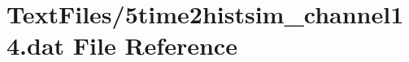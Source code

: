 \hypertarget{5time2histsim__channel14_8dat}{}\section{Text\+Files/5time2histsim\+\_\+channel14.dat File Reference}
\label{5time2histsim__channel14_8dat}
